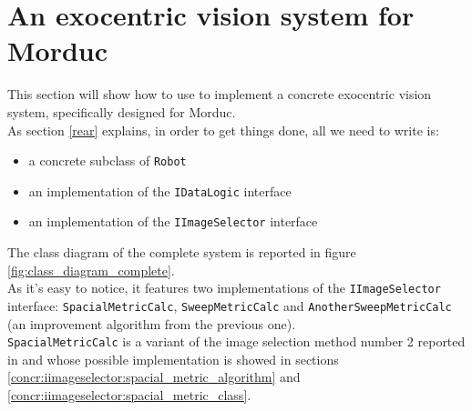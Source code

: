 \setcounter{figure}{0}
\setcounter{table}{0}
\setcounter{lstlisting}{0}

\chapter{An exocentric vision system for Morduc}
\label{concr}
\minitoc

This section will show how to use \framework{} to implement a 
concrete exocentric vision system, specifically designed for 
Morduc.
\\
As section \ref{rear} explains, in order to get things 
done, all we need to write is:

\begin{itemize}
\item a concrete subclass of \texttt{Robot}
\item an implementation of the \texttt{IDataLogic} interface
\item an implementation of the \texttt{IImageSelector} interface
\end{itemize}

The class diagram of the complete system is reported in figure
\ref{fig:class_diagram_complete}. 
\\
As it's easy to notice, it features two implementations 
of the \texttt{IImageSelector} interface: \texttt{SpacialMetricCalc},
\texttt{SweepMetricCalc} and \texttt{AnotherSweepMetricCalc}
(an improvement algorithm from the previous one).
\\
\texttt{SpacialMetricCalc} is a variant 
of the image selection method number 2 reported in \cite{sugimoto} and 
whose possible implementation is showed in sections
\ref{concr:iimageselector:spacial_metric_algorithm} and
\ref{concr:iimageselector:spacial_metric_class}.

